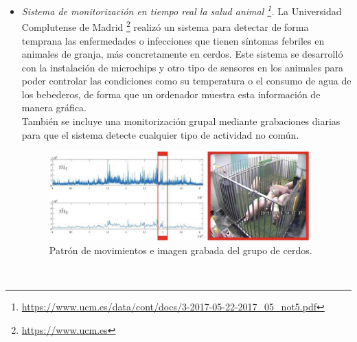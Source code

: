 \begin{itemize}
 \item \textit{Sistema de monitorización en tiempo real la salud animal \footnote{\url{https://www.ucm.es/data/cont/docs/3-2017-05-22-2017_05_not5.pdf}}.} La Universidad Complutense de Madrid \footnote{\url{https://www.ucm.es}} realizó un sistema para detectar de forma temprana las enfermedades o infecciones que tienen síntomas febriles en animales de granja, más concretamente en cerdos. Este sistema se desarrolló con la instalación de microchips y otro tipo de sensores en los animales para poder controlar las condiciones como su temperatura o el consumo de agua de los bebederos, de forma que un ordenador muestra esta información de manera gráfica.\\
También se incluye una monitorización grupal mediante grabaciones diarias para que el sistema detecte cualquier tipo de actividad no común. 
\begin{figure} [h!]
  \begin{center}
    \includegraphics[width=10cm]{figs/ucm}
  \end{center}
  \caption{Patrón de movimientos e imagen grabada del grupo de cerdos.}
  \label{fig:uc}
\end{figure}\


\end{itemize}
